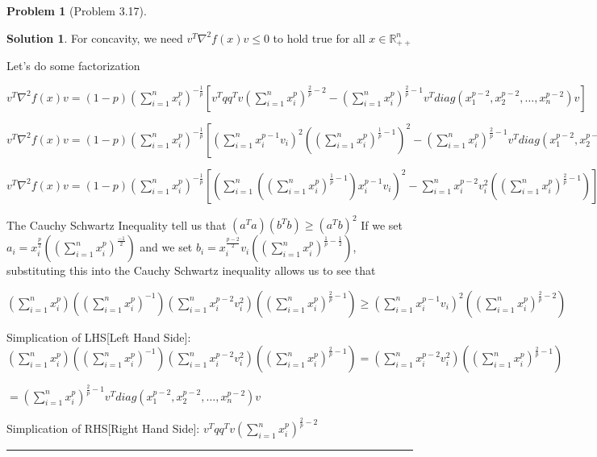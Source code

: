 \documentclass{article}
\theoremstyle{definition}
\newtheorem{problem}{Problem}
\def\fline{\rule{0.75\linewidth}{0.5pt}}
\newcommand{\finishline}{\begin{center}\fline\end{center}}
\newtheorem*{solution*}{Solution}
\newenvironment{solution}{\begin{solution*}}{{\finishline} \end{solution*}}
\begin{document}
\begin{problem} [Problem 3.17]
\begin{solution}
    For concavity, we need $v^T \nabla^2f(x) v \leq 0$ to hold true for all $x \in \mathbb{R}^n_{++}$ \newline 

    Let's do some factorization \newline 

    $v^T \nabla^2f(x) v  = (1 - p) (\sum_{i=1}^{n} x_i^p)^{-\frac{1}{p}} [v^Tqq^Tv (\sum_{i=1}^{n} x_i^p)^{\frac{2}{p} - 2} - (\sum_{i=1}^{n} x_i^p)^{\frac{2}{p} - 1} v^T diag(x_1^{p - 2}, x_2^{p - 2}, \dots, x_n^{p - 2}) v]$

    $v^T \nabla^2f(x) v  = (1 - p) (\sum_{i=1}^{n} x_i^p)^{-\frac{1}{p}} [(\sum_{i=1}^{n} x_i^{p - 1} v_i)^2 ((\sum_{i=1}^{n} x_i^p)^{\frac{1}{p} - 1})^2 - (\sum_{i=1}^{n} x_i^p)^{\frac{2}{p} - 1} v^T diag(x_1^{p - 2}, x_2^{p - 2}, \dots, x_n^{p - 2}) v]$

    $v^T \nabla^2f(x) v  = (1 - p) (\sum_{i=1}^{n} x_i^p)^{-\frac{1}{p}} [(\sum_{i=1}^{n} ((\sum_{i=1}^{n} x_i^p)^{\frac{1}{p} - 1}) x_i^{p - 1} v_i)^2  - \sum_{i=1}^{n} x_i^{p - 2} v_i^2 ((\sum_{i=1}^{n} x_i^p)^{\frac{2}{p} - 1})]$


    The Cauchy Schwartz Inequality tell us that $(a^Ta) (b^Tb) \geq (a^Tb)^2$ \newline 
    If we set $a_i = x_i^{\frac{p}{2}} ((\sum_{i=1}^{n} x_i^p)^{\frac{-1}{2}})$ and we set $b_i = x_i^{\frac{p - 2}{2}} v_i ((\sum_{i=1}^{n} x_i^p)^{\frac{1}{p} - \frac{1}{2}})$, substituting this into the Cauchy Schwartz inequality allows us to see that 

    $(\sum_{i=1}^{n} x_i^p)  ((\sum_{i=1}^{n} x_i^p)^{-1}) (\sum_{i=1}^{n} x_i^{p - 2} v_i^2) ((\sum_{i=1}^{n} x_i^p)^{\frac{2}{p} - 1}) \geq (\sum_{i = 1}^{n} x_i^{p - 1} v_i )^2 ((\sum_{i=1}^{n} x_i^p)^{\frac{2}{p} - 2})$ \newline 

    Simplication of LHS[Left Hand Side]: \newline 
    $(\sum_{i=1}^{n} x_i^p)  ((\sum_{i=1}^{n} x_i^p)^{-1}) (\sum_{i=1}^{n} x_i^{p - 2} v_i^2) ((\sum_{i=1}^{n} x_i^p)^{\frac{2}{p} - 1}) = (\sum_{i=1}^{n} x_i^{p - 2} v_i^2) ((\sum_{i=1}^{n} x_i^p)^{\frac{2}{p} - 1})$ \newline 
    
    $= (\sum_{i=1}^{n} x_i^p)^{\frac{2}{p} - 1} v^T diag(x_1^{p - 2}, x_2^{p - 2}, \dots, x_n^{p - 2}) v$

    Simplication of RHS[Right Hand Side]: \newline 
    $v^Tqq^Tv (\sum_{i=1}^{n} x_i^p)^{\frac{2}{p} - 2}$


\end{solution}
\end{problem}
\end{document}
